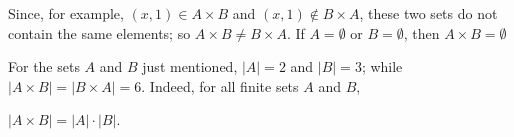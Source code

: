 \documentclass[12pt,oneside]{article}
\begin{document}
\begin{flushleft}
Since, for example, $(x,1) \in A \times B$ and $(x,1) \notin B \times A$, these two sets do not contain the same elements; so $A \times B \neq B \times A$. If $A = \emptyset$ or $B = \emptyset$, then $A \times B = \emptyset$
\end{flushleft}

For the sets $A$ and $B$ just mentioned, $|A| = 2$ and $|B| = 3$; while $|A \times B| = |B \times A| = 6$. Indeed, for all finite sets $A$ and $B$,

\begin{center}
    $|A \times B| = |A| \cdot |B|$.
\end{center}


\end{document}
